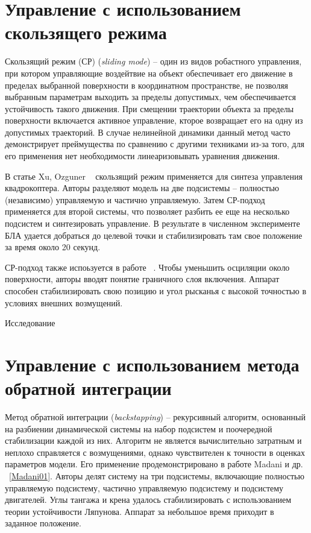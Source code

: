 \section{Управление с использованием скользящего режима}

Скользящий режим (СР) (\textit{sliding mode}) -- один из видов робастного управления, при котором управляющие воздейтвие на объект обеспечивает его движение в пределах выбранной поверхности в координатном пространстве, не позволяя выбранным параметрам выходить за пределы допустимых, чем обеспечивается устойчивость такого движения. При смещении траектории объекта за пределы поверхности включается активное управление, кторое возвращает его на одну из допустимых траекторий. В случае нелинейной динамики данный метод часто демонстрирует преймущества по сравнению с другими техниками из-за того, для его применения нет необходимости линеаризовывать уравнения движения.

В статье Xu, Ozguner ~\cite{Xu01} скользящий режим применяется для синтеза управления квадрокоптера. Авторы разделяют модель на две подсистемы -- полностью (независимо) управляемую и частично управляемую. Затем СР-подход применяется для второй системы, что позволяет разбить ее еще на несколько подсистем и синтезировать управление. В результате в численном эксперименте БЛА удается добраться до целевой точки и стабилизировать там свое положение за время около 20 секунд.

СР-подход также испоьзуется в работе ~\cite{Runcharoon01}. Чтобы уменьшить осциляции около поверхности, авторы вводят понятие граничного слоя включения. Аппарат способен стабилизировать свою позицию и угол рысканья с высокой точностью в условиях внешних возмущений.

Исследование ~\cite{Sumantri01}

\section{Управление с использованием метода обратной интеграции}

Метод обратной интеграции (\textit{backstapping}) -- рекурсивный алгоритм, основанный на разбиении динамической системы на набор подсистем и поочередной стабилизации каждой из них. Алгоритм не является вычислительно затратным и неплохо справляется с возмущениями, однако чувствителен к точности в оценках параметров модели. Его применение продемонстрировано в работе Madani и др. ~\ref{Madani01}. Авторы делят систему на три подсистемы, включающие полностью управляемую подсистему, частично управляемую подсистему и подсистему двигателей. Углы тангажа и крена удалось стабилизировать с использованием теории устойчивости Ляпунова. Аппарат за небольшое время приходит в заданное положение.

